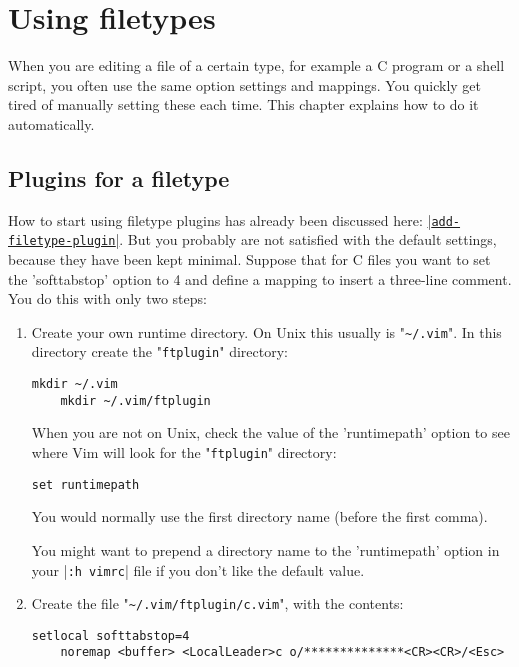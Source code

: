 \section{Using filetypes}
When you are editing a file of a certain type, for example a C program or a shell script, you often use the same option settings and mappings.
You quickly get tired of manually setting these each time.
This chapter explains how to do it automatically.
\subsection{Plugins for a filetype}            
\label{filetype-plugin}
How to start using filetype plugins has already been discussed here: \hyperref[add-filetype-plugin]{|\texttt{add-filetype-plugin}|}.
But you probably are not satisfied with the default settings, because they have been kept minimal.
Suppose that for C files you want to set the 'softtabstop' option to 4 and define a mapping to insert a three-line comment.
You do this with only two steps:

\label{your-runtime-dir}
\begin{enumerate}
				\item Create your own runtime directory.
								On Unix this usually is "\verb!~/.vim!".
								In this directory create the "\verb!ftplugin!" directory:

								\begin{Verbatim}[samepage=true]
	mkdir ~/.vim
	mkdir ~/.vim/ftplugin
								\end{Verbatim}


								When you are not on Unix, check the value of the 'runtimepath' option to see where Vim will look for the "\verb!ftplugin!" directory:

								\begin{Verbatim}[samepage=true]
 set runtimepath
								\end{Verbatim}

								You would normally use the first directory name (before the first comma).

								You might want to prepend a directory name to the 'runtimepath' option in your |\verb!:h vimrc!| file if you don't like the default value.

				\item Create the file "\verb!~/.vim/ftplugin/c.vim!", with the contents:
								\begin{Verbatim}[samepage=true]
	setlocal softtabstop=4
	noremap <buffer> <LocalLeader>c o/**************<CR><CR>/<Esc>
								\end{Verbatim}
\end{enumerate}

